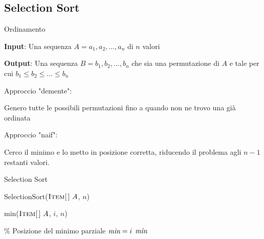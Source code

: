 \subsection{Selection Sort}

\begin{frame}{Ordinamento}

\vspace{-9pt}
\begin{myboxtitle}
\BI
\item \textbf{Input}: Una sequenza $A= a_1, a_2, \ldots, a_n$ di $n$ valori
\item \textbf{Output}: Una sequenza $B= b_1, b_2, \ldots, b_n$ che sia una permutazione di $A$ e tale per cui $b_1 \leq b_2 \leq \ldots \leq b_n$ 
\EI
\end{myboxtitle}

\bigskip
Approccio "demente":
\BI
\item Genero tutte le possibili permutazioni fino a quando non ne trovo una già ordinata
\EI

\bigskip\pause
Approccio "naif":
\BI
\item Cerco il minimo e lo metto in posizione corretta, riducendo il problema agli $n-1$ restanti valori.
\EI

\end{frame}


\begin{frame}{Selection Sort}

\vspace{-6pt}
\begin{Procedure}
\caption[A]{\textsf{SelectionSort}($\textsc{Item}[\,]\ A$, \INTEGER $n$)}
\end{Procedure}

\vspace{-12pt}
\begin{Procedure}
\caption[A]{\INTEGER \textsf{min}($\textsc{Item}[\,]\ A$, \INTEGER $i$, \INTEGER $n$)}{
  \% Posizione del minimo parziale\;
  \INTEGER $\textit{min} = i$\;
  {
  }
  \Return $\textit{min}$
}
\end{Procedure}
\end{frame}




